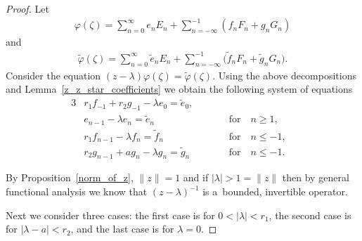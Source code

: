 \documentclass[pdftex]{sigma}
\numberwithin{equation}{section}
\begin{document}
\begin{proof}
Let
\begin{gather*}
\varphi(\zeta)=\sum\limits_{n=0}^\infty e_n E_n+\sum\limits_{n=-\infty}^{-1}(f_nF_n+g_nG_n)
\end{gather*}
and
\begin{gather*}
\tilde{\varphi}(\zeta)=\sum\limits_{n=0}^\infty \tilde{e}_n E_n+\sum\limits_{n=-\infty}^{-1}\big(\tilde{f}_nF_n+\tilde{g}_nG_n\big).
\end{gather*}
Consider the equation $(z-\lambda)\varphi(\zeta)=\tilde{\varphi}(\zeta)$.
Using the above decompositions and Lemma~\ref{z_z_star_coefficients} we obtain the following system of equations
\begin{alignat}{3}
&  r_1f_{-1}+r_2g_{-1}-\lambda e_0=\tilde{e}_0,\qquad &&&\nonumber
\\
& e_{n-1}-\lambda e_n=\tilde{e}_n \quad &&\text{for} \quad n\ge1, &\nonumber
\\
& r_1f_{n-1}-\lambda f_n=\tilde{f}_n \quad &&\text{for} \quad n\le-1,&\nonumber
\\
 & r_2g_{n-1}+ag_n-\lambda g_n=\tilde{g}_n \quad &&\text{for} \quad  n\le-1. & \label{resolvent_system}
\end{alignat}

By Proposition~\ref{norm_of_z}, $\|z\|=1$ and if $|\lambda|>1=\|z\|$ then by general functional analysis we know that
$(z-\lambda)^{-1}$ is a~bounded, invertible operator.

Next we consider three cases: the f\/irst case is for $0<|\lambda|<r_1$, the second case is for $|\lambda-a|<r_2$, and the
last case is for $\lambda=0$.


\end{proof}
\end{document}
